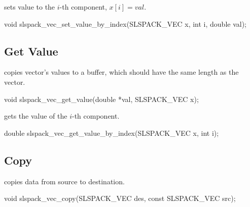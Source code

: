  sets value to the $i$-th component, $x[i] = val$.
\begin{evb}
void slspack_vec_set_value_by_index(SLSPACK_VEC x, int i, double val);
\end{evb}

\subsection{Get Value}
 copies vector's values to a buffer, which should have the same length as
the vector.
\begin{evb}
void slspack_vec_get_value(double *val, SLSPACK_VEC x);
\end{evb}

 gets the value of the $i$-th component.
\begin{evb}
double slspack_vec_get_value_by_index(SLSPACK_VEC x, int i);
\end{evb}

\subsection{Copy}
 copies data from source to destination.
\begin{evb}
void slspack_vec_copy(SLSPACK_VEC des, const SLSPACK_VEC src);
\end{evb}
